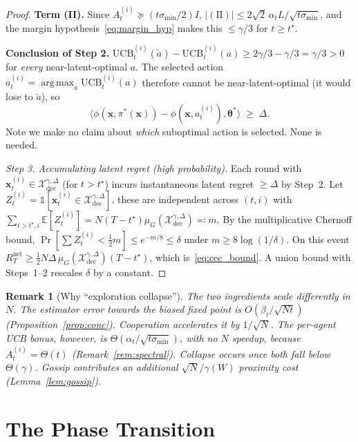 \documentclass[11pt]{article}
\newtheorem{remark}[theorem]{Remark}
\DeclareMathOperator*{\argmax}{arg\,max}
\begin{document}
\begin{proof}
\textbf{Term (II).}
Since $A_t^{(i)}\succeq(t\sigma_{\min}/2)I$,
$|(\mathrm{II})|\leq 2\sqrt{2}\,\alpha_t L/\sqrt{t\sigma_{\min}}$, and
the margin hypothesis~\eqref{eq:margin_hyp} makes this $\leq\gamma/3$
for $t\geq t^\star$.

\textbf{Conclusion of Step 2.}
$\mathrm{UCB}_t^{(i)}(\tilde a)-\mathrm{UCB}_t^{(i)}(a)
\geq 2\gamma/3-\gamma/3=\gamma/3>0$ for \emph{every}
near-latent-optimal $a$.  The selected action
$a_t^{(i)}=\argmax_a\mathrm{UCB}_t^{(i)}(a)$ therefore cannot be
near-latent-optimal (it would lose to $\tilde a$), so
\[
\langle\phi(\bm{x},\pi^{\!*}(\bm{x}))-\phi(\bm{x},a_t^{(i)}),
\bm{\theta}^{\!*}\rangle\;\geq\;\Delta .
\]
Note we make no claim about \emph{which} suboptimal action is selected. None is needed.

\textit{Step 3. Accumulating latent regret (high probability).}
Each round with $\bm{x}_t^{(i)}\in\mathcal{X}_{\mathrm{dec}}^{\gamma,\Delta}$
(for $t>t^\star$) incurs instantaneous latent regret $\geq\Delta$ by
Step~2.  Let
$Z_t^{(i)}=\mathbb{1}[\bm{x}_t^{(i)}\in\mathcal{X}_{\mathrm{dec}}^{\gamma,\Delta}]$.
these are independent across $(t,i)$ with
$\sum_{t>t^\star,i}\mathbb{E}[Z_t^{(i)}]
=N(T-t^\star)\mu_G(\mathcal{X}_{\mathrm{dec}}^{\gamma,\Delta})\eqqcolon m$.
By the multiplicative Chernoff bound,
$\Pr[\sum Z_t^{(i)}<\tfrac12 m]\leq e^{-m/8}\leq\delta$
under $m\geq 8\log(1/\delta)$.  On this event
$R_T^{\mathrm{net}}\geq\tfrac12 N\Delta\,
\mu_G(\mathcal{X}_{\mathrm{dec}}^{\gamma,\Delta})(T-t^\star)$,
which is~\eqref{eq:cec_bound}. A union bound with Steps~1--2 rescales
$\delta$ by a constant.
\end{proof}

\begin{remark}[Why ``exploration collapse'']\label{rem:mech}
The two ingredients scale differently in $N$.  The \emph{estimator
error} towards the biased fixed point is $O(\beta_t/\sqrt{Nt})$
(Proposition~\ref{prop:conc}). Cooperation \emph{accelerates} it by
$1/\sqrt N$.  The per-agent \emph{UCB bonus}, however, is
$\Theta(\alpha_t/\sqrt{t\sigma_{\min}})$, with \emph{no} $N$ speedup,
because $A_t^{(i)}=\Theta(t)$ (Remark~\ref{rem:spectral}).  Collapse
occurs once \emph{both} fall below $\Theta(\gamma)$.  Gossip
contributes an additional $\sqrt N/\gamma(W)$ proximity cost
(Lemma~\ref{lem:gossip}).
\end{remark}

\section{The Phase Transition}\label{sec:phase}
\end{document}
